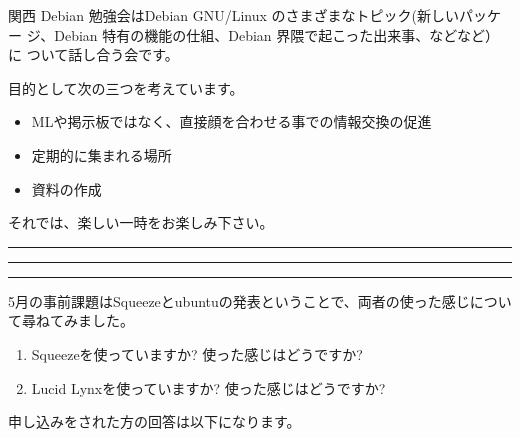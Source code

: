 \documentclass[mingoth,a4paper]{jsarticle}
\begin{document}
関西 Debian 勉強会はDebian GNU/Linux のさまざまなトピック(新しいパッケー
ジ、Debian 特有の機能の仕組、Debian 界隈で起こった出来事、などなど）に
ついて話し合う会です。

目的として次の三つを考えています。
\begin{itemize}
      \item MLや掲示板ではなく、直接顔を合わせる事での情報交換の促進
      \item 定期的に集まれる場所
      \item 資料の作成
\end{itemize}

それでは、楽しい一時をお楽しみ下さい。

\clearpage

\begin{minipage}[b]{0.2\hsize}
 {}
\end{minipage}
\begin{minipage}[b]{0.8\hsize}
\hrule
\vspace{2mm}
\hrule
\setcounter{tocdepth}{1}
\tableofcontents
\vspace{2mm}
\hrule
\end{minipage}


5月の事前課題はSqueezeとubuntuの発表ということで、両者の使った感じについ
て尋ねてみました。

\begin{enumerate}
 \item Squeezeを使っていますか? 使った感じはどうですか? 
 \item Lucid Lynxを使っていますか? 使った感じはどうですか?
\end{enumerate}

申し込みをされた方の回答は以下になります。

\end{document}
